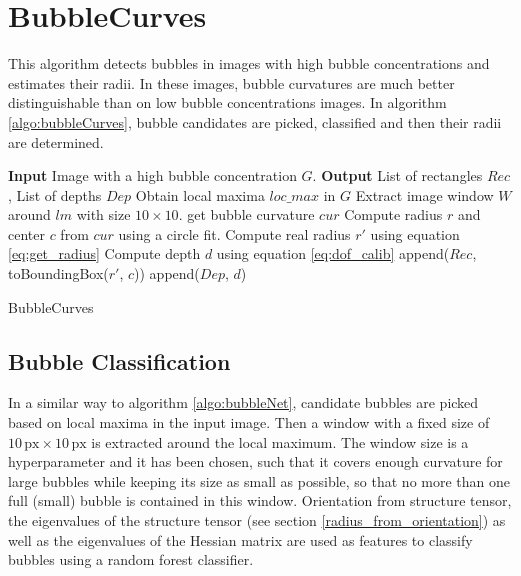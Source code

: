 	
	
	\section{BubbleCurves}\label{BubbleCurves}
		This algorithm detects bubbles in images with high bubble concentrations and estimates their radii. In these images, bubble curvatures are much better distinguishable than on low bubble concentrations images. In algorithm \ref{algo:bubbleCurves}, bubble candidates are picked, classified and then their radii are determined.
	
		\begin{algorithm}
			\begin{algorithmic}[1]
				\State \textbf{Input} Image with a high bubble concentration $G$. 
				\State \textbf{Output} List of rectangles $Rec$, List of depths $Dep$
				\State Obtain local maxima $loc\_max$ in $G$
					\State Extract image window $W$ around $lm$ with size $10 \times 10$.
						\State get bubble curvature $cur$ 
						\State Compute radius $r$ and center $c$ from $cur$ using a circle fit.
						\State Compute real radius $r'$ using equation \ref{eq:get_radius}
						\State Compute depth $d$ using equation \ref{eq:dof_calib}
						\State append($Rec$, toBoundingBox($r'$, $c$))
						\State append($Dep$, $d$)
					\EndIf
				\EndFor
			\end{algorithmic}
			
			\caption{BubbleCurves}
			\label{algo:bubbleCurves}
		\end{algorithm}
	
	
	
	
	
	
	\subsection{Bubble Classification}\label{bubble_classification}
		In a similar way to algorithm \ref{algo:bubbleNet}, candidate bubbles are picked based on local maxima in the input image. Then a window with a fixed size of $10 \, \text{px} \times 10 \, \text{px}$ is extracted around the local maximum. The window size is a hyperparameter and it has been chosen, such that it covers enough curvature for large bubbles while keeping its size as small as possible, so that no more than one full (small) bubble is contained in this window. 
		 Orientation from structure tensor, the eigenvalues of the structure tensor (see section \ref{radius_from_orientation}) as well as the eigenvalues of the Hessian matrix are used as features to classify bubbles using a random forest classifier. 
		
